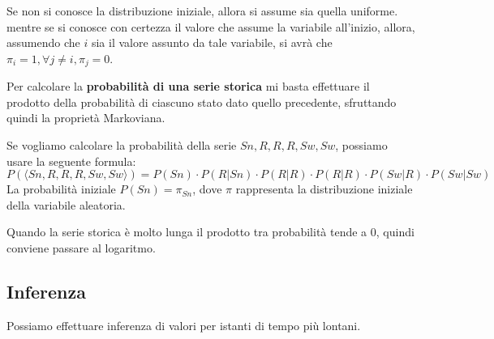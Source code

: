 Se non si conosce la distribuzione iniziale, allora si assume sia quella uniforme.
mentre se si conosce con certezza il valore che assume la variabile all'inizio,
allora, assumendo che $i$ sia il valore assunto da tale variabile, si avrà che
$\pi_i = 1, \forall j \neq i, \pi_j=0$.

Per calcolare la \textbf{probabilità di una serie storica} mi basta effettuare
il prodotto della probabilità di ciascuno stato dato quello precedente, sfruttando
quindi la proprietà Markoviana.
\begin{esempio}
    Se vogliamo calcolare la probabilità della serie $Sn, R,R,R,Sw,Sw$, possiamo
    usare la seguente formula:
    \begin{equation*}
        P(\langle Sn, R,R,R,Sw,Sw \rangle) = P(Sn) \cdot P(R|Sn) \cdot P(R|R)
        \cdot P(R|R)\cdot P(Sw|R) \cdot P(Sw|Sw)
    \end{equation*}
    La probabilità iniziale $P(Sn) = \pi_{Sn}$, dove $\pi$ rappresenta la
    distribuzione iniziale della variabile aleatoria.
\end{esempio}
Quando la serie storica è molto lunga il prodotto tra probabilità tende a $0$,
quindi conviene passare al logaritmo.
\subsection{Inferenza}
Possiamo effettuare inferenza di valori per istanti di tempo più lontani.

